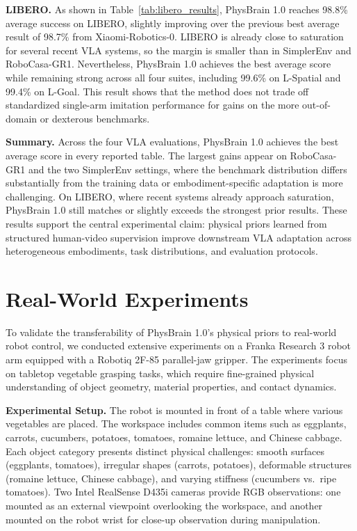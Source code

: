 \documentclass{llmxive}
\providecommand{\paragraph}[1]{\noindent\textbf{#1.}\hspace*{1em}}
\begin{document}
\paragraph{LIBERO}
As shown in Table~\ref{tab:libero_results}, PhysBrain 1.0 reaches 98.8\% average success on LIBERO, slightly improving over the previous best average result of 98.7\% from Xiaomi-Robotics-0. LIBERO is already close to saturation for several recent VLA systems, so the margin is smaller than in SimplerEnv and RoboCasa-GR1. Nevertheless, PhysBrain 1.0 achieves the best average score while remaining strong across all four suites, including 99.6\% on L-Spatial and 99.4\% on L-Goal. This result shows that the method does not trade off standardized single-arm imitation performance for gains on the more out-of-domain or dexterous benchmarks.

\paragraph{Summary}
Across the four VLA evaluations, PhysBrain 1.0 achieves the best average score in every reported table. The largest gains appear on RoboCasa-GR1 and the two SimplerEnv settings, where the benchmark distribution differs substantially from the training data or embodiment-specific adaptation is more challenging. On LIBERO, where recent systems already approach saturation, PhysBrain 1.0 still matches or slightly exceeds the strongest prior results. These results support the central experimental claim: physical priors learned from structured human-video supervision improve downstream VLA adaptation across heterogeneous embodiments, task distributions, and evaluation protocols.

\section{Real-World Experiments}
\label{sec:real_world_franka}

To validate the transferability of PhysBrain 1.0's physical priors to real-world robot control, we conducted extensive experiments on a Franka Research 3 robot arm equipped with a Robotiq 2F-85 parallel-jaw gripper. The experiments focus on tabletop vegetable grasping tasks, which require fine-grained physical understanding of object geometry, material properties, and contact dynamics.

\paragraph{Experimental Setup}
The robot is mounted in front of a table where various vegetables are placed. The workspace includes common items such as eggplants, carrots, cucumbers, potatoes, tomatoes, romaine lettuce, and Chinese cabbage. Each object category presents distinct physical challenges: smooth surfaces (eggplants, tomatoes), irregular shapes (carrots, potatoes), deformable structures (romaine lettuce, Chinese cabbage), and varying stiffness (cucumbers vs.~ripe tomatoes). Two Intel RealSense D435i cameras provide RGB observations: one mounted as an external viewpoint overlooking the workspace, and another mounted on the robot wrist for close-up observation during manipulation.
\end{document}
